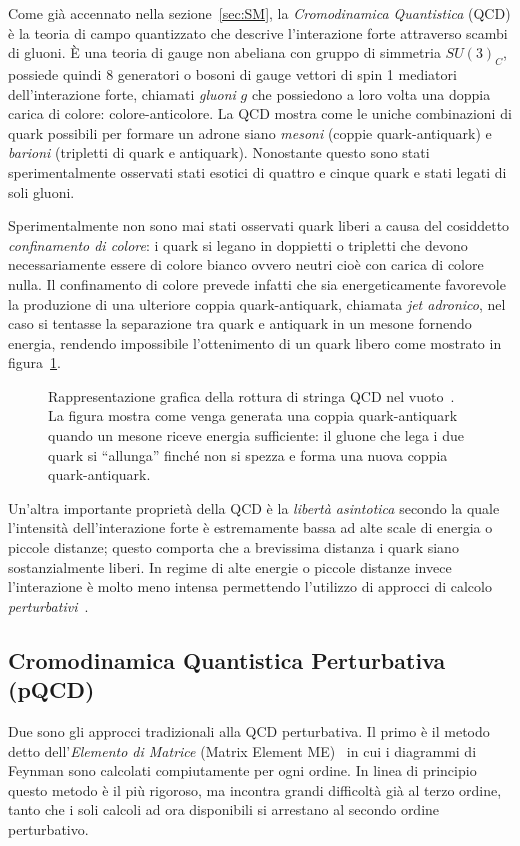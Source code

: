     Come già accennato nella sezione~\ref{sec:SM}, la \textit{Cromodinamica Quantistica} (QCD) è la teoria di campo quantizzato che descrive l'interazione forte attraverso scambi di gluoni. È una teoria di gauge non abeliana con gruppo di simmetria $SU(3)_C$, possiede quindi 8 generatori o bosoni di gauge vettori di spin 1 mediatori dell'interazione forte, chiamati \textit{gluoni} $g$ che possiedono a loro volta una doppia carica di colore: colore-anticolore. La QCD mostra come le uniche combinazioni di quark possibili per formare un adrone siano \textit{mesoni} (coppie quark-antiquark) e \textit{barioni} (tripletti di quark e antiquark). Nonostante questo sono stati sperimentalmente osservati stati esotici di quattro e cinque quark e stati legati di soli gluoni.

    Sperimentalmente non sono mai stati osservati quark liberi a causa del cosiddetto \textit{confinamento di colore}: i quark si legano in doppietti o tripletti che devono necessariamente essere di colore bianco ovvero neutri cioè con carica di colore nulla. Il confinamento di colore prevede infatti che sia energeticamente favorevole la produzione di una ulteriore coppia quark-antiquark, chiamata \textit{jet adronico}, nel caso si tentasse la separazione tra quark e antiquark in un mesone fornendo energia, rendendo impossibile l'ottenimento di un quark libero come mostrato in figura~\ref{fig:2-hadron-jet}.

    \begin{figure}[t]
        \centering
        
        \caption{Rappresentazione grafica della rottura di stringa QCD nel vuoto~\cite{Wikimedia_Quark_Confinement}. La figura mostra come venga generata una coppia quark-antiquark quando un mesone riceve energia sufficiente: il gluone che lega i due quark si ``allunga'' finché non si spezza e forma una nuova coppia quark-antiquark.}
        \label{fig:2-hadron-jet}
    \end{figure}

    Un'altra importante proprietà della QCD è la \textit{libertà asintotica} secondo la quale l'intensità dell'interazione forte è estremamente bassa ad alte scale di energia o piccole distanze; questo comporta che a brevissima distanza i quark siano sostanzialmente liberi. In regime di alte energie o piccole distanze invece l'interazione è molto meno intensa permettendo l'utilizzo di approcci di calcolo \textit{perturbativi}~\cite{BGS_2012}.

    \subsection{Cromodinamica Quantistica Perturbativa (pQCD)}
        Due sono gli approcci tradizionali alla QCD perturbativa. Il primo è il metodo detto dell'\textit{Elemento di Matrice} (Matrix Element ME)~\cite{Vitale_1995} in cui i diagrammi di Feynman sono calcolati compiutamente per ogni ordine. In linea di principio questo metodo è il più rigoroso, ma incontra grandi difficoltà già al terzo ordine, tanto che i soli calcoli ad ora disponibili si arrestano al secondo ordine perturbativo.

